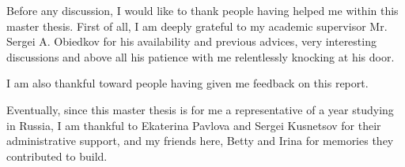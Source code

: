 \documentclass[a4paper]{report}
\begin{document}
	

	



Before any discussion, I would like to thank people having helped me within this master thesis. First of all, I am deeply grateful to my academic supervisor Mr. Sergei A. Obiedkov for his availability and previous advices, very interesting discussions and above all his patience with me relentlessly knocking at his door.

I am also thankful toward people having given me feedback on this report.

Eventually, since this master thesis is for me a representative of a year studying in Russia, I am thankful to Ekaterina Pavlova and Sergei Kusnetsov for their administrative support, and my friends here, Betty and Irina for memories they contributed to build.

\newpage
\listoffigures
\newpage

\newpage
\listoftables
\newpage

\newpage
\listofalgorithms
\newpage



\tableofcontents















\newpage
{}
\setcounter{page}{8}


	

\newpage
\end{document}
